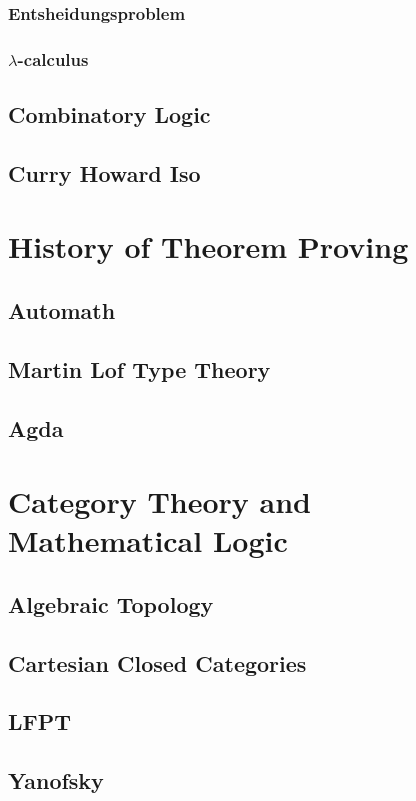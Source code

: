 \subsubsection{Entsheidungsproblem}
\subsubsection{$\lambda$-calculus}
\subsection{Combinatory Logic}
\subsection{Curry Howard Iso}

\section{History of Theorem Proving}
\subsection{Automath}
\subsection{Martin Lof Type Theory}
\subsection{Agda}

\section{Category Theory and Mathematical Logic}
\subsection{Algebraic Topology}
\subsection{Cartesian Closed Categories}
\subsection{LFPT}
\subsection{Yanofsky}

